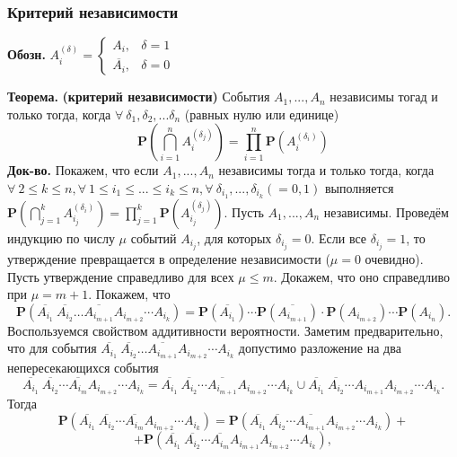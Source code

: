 \documentclass[oneside,final,14pt]{extreport}
\newcommand\myth{{\bf Теорема.}}
\newcommand\myqed{{\bf Док-во.}}
\newcommand\myprob[1]{{\mathbf{P}(#1)}}
\newcommand\mydes{{\bf Обозн.}}
\theoremstyle{definition}
\begin{document}
\subsubsection{Критерий независимости}

\mydes{} $A_{i}^{(\delta)}=\left\{\begin{array}{ll}A_{i}, & \delta=1 \\ \overline{A_{i}}, & \delta=0\end{array}\right.$

\myth{} {\bf (критерий независимости) }
События $A_1, ..., A_n$ независимы тогад и только тогда, когда $\forall ~ \delta_1, \delta_2, ... \delta_n$ (равных нулю или единице) $$\myprob{\bigcap_{i=1}^{n} A_{i}^{\left(\delta_{j}\right)}}=\prod_{i=1}^{n}\myprob{A_{i}^{\left(\delta_{i}\right)}}$$
\myqed{} Покажем, что если $A_1, ..., A_n$ независимы тогда и только тогда, когда $\forall ~ 2 \leq k \leq n, \forall ~ 1 \leq i_1 \leq ... \leq i_k \leq n, \forall ~ \delta_{i_1}, ..., \delta_{i_k} (= 0, 1)$ выполняется $\mathbf{P}\left(\bigcap_{j=1}^{k}A_{i_{j}}^{\left(\delta_{i}\right)}\right)=\prod_{j=1}^{k} \mathbf{P}\left(A_{i_{j}}^{\left(\delta_{j}\right)}\right)$. Пусть $A_1, ..., A_n$ независимы. Проведём индукцию по числу $\mu$ событий $A_{i_j}$, для которых $\delta_{i_j} = 0$. Если все $\delta_{i_j} = 1$, то утверждение превращается в определение независимости ($\mu = 0$ очевидно). 
Пусть утверждение справедливо для всех $\mu \leq m$. Докажем, что оно справедливо при $\mu = m + 1$. Покажем, что $$\mathbf{P}\left(\overline{A_{i_{1}}}~ \overline{A_{i_{2}}} \ldots \overline{A_{i_{m+1}}} A_{i_{m+2}} \cdots A_{i_{k}}\right)=\mathbf{P}(\overline{A_{i_{1}}}) \cdots \mathbf{P}(\overline{A_{i_{m+1}}}) \cdot \mathbf{P}\left(A_{i_{m+2}}\right) \cdots \mathbf{P}\left(A_{i_{n}}\right).$$
Воспользуемся свойством аддитивности вероятности. Заметим предварительно, что для события $\overline{A_{i_{1}}}~ \overline{A_{i_{2}}} \ldots \overline{A_{i_{m+1}}} A_{i_{m+2}} \cdots A_{i_{k}}$ допустимо разложение на два непересекающихся события $$\overline{A_{i_{1}}}~\overline{A_{i_{2}}} \cdots \overline{A_{i_{m}}} A_{i_{m+2}} \cdots A_{i_{k}}=\overline{A_{i_{1}}}~\overline{A_{i_{2}}} \cdots \overline{A_{i_{m+1}}} A_{i_{m+2}} \cdots A_{i_{k}} \cup \overline{A_{i_{1}}}~ \overline{A_{i_{2}}} \cdots A_{i_{m+1}} A_{i_{m+2}} \cdots A_{i_{k}}.$$
Тогда
$$\mathbf{P}\left(\overline{A_{i_{1}}}~\overline{A_{i_{2}}} \cdots \overline{A_{i_{m}}} A_{i_{m+2}} \cdots A_{i_{k}}\right)=\mathbf{P}\left(\overline{A_{i_{1}}}~\overline{A_{i_{2}}} \cdots \overline{A_{i_{m+1}}} A_{i_{m+2}} \cdots A_{i_{k}}\right)+
$$$$+\mathbf{P}\left(\overline{A_{i_{1}}}~\overline{A_{i_{2}}} \cdots \overline{A_{i_{m}}} A_{i_{m+1}} A_{i_{m+2}} \cdots A_{i_{k}}\right),$$
\end{document}

